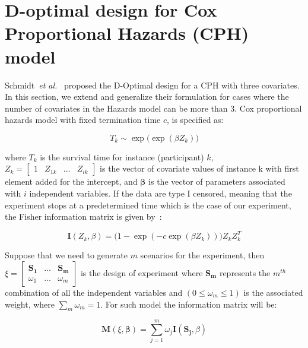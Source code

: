\chapter{D-optimal design for Cox Proportional Hazards (CPH) model}
\label{A:design}
Schmidt~\textit{et al.}~\cite{schmidt2015optimal} proposed the D-Optimal design for a CPH with three covariates. In this section, we extend and generalize their formulation for cases where the number of covariates in the Hazards model can be more than 3. Cox proportional hazards model with fixed termination time $c$, is specified as: 
\begin{linenomath}
\begin{equation}
    T_k \sim \exp\Big(\exp( \beta Z_k)\Big)
\end{equation}
\end{linenomath}
where $T_k$ is the survival time for instance (participant) $k$, \(Z_k = \begin{bmatrix}
1 & Z_{1k} & ... &Z_{ik}
\end{bmatrix} \) is the vector of covariate values of instance k with first element added for the intercept, and $\mathbf{\beta}$ is the vector of parameters associated with $i$ independent variables. If the data are type I censored, meaning that the experiment stops at a predetermined time which is the case of our experiment, the Fisher information matrix is given by~\citep{konstantinou2014optimal}:
\begin{linenomath}
\begin{equation}
\mathbf{I}(Z_k,\beta)=\Big(1- \exp (-c \exp(\beta Z_k ))\Big)Z_k Z_k^T
\end{equation} 
\end{linenomath}
Suppose that we need to generate $m$  scenarios for the experiment, then
\(
\xi = \begin{bmatrix}
\mathbf{S_1} & ... & \mathbf{S_m}\\
\omega_1 &... & \omega_m
\end{bmatrix}
\) is the design of experiment where
$\mathbf{S_m}$ represents the $m^{th}$ combination of all the independent variables and $(0\leq \omega_m \leq 1)$ is the associated weight, where $\sum_m\omega_m = 1$. For such model the information matrix will be:
\begin{linenomath}
\begin{equation}
 \mathbf{M}(\xi, \mathbf{\beta}) = \sum_{j=1}^m \omega_j \mathbf{I}(\mathbf{S_j},\beta)
\end{equation}
\end{linenomath}
